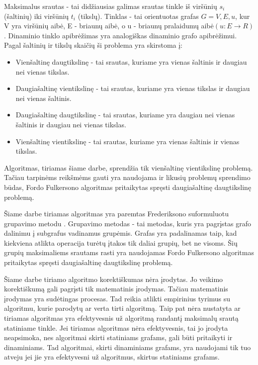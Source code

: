 Maksimalus srautas - tai didžiausias galimas srautas tinkle iš viršūnių $s_i$ (šaltinių) iki viršūnių $t_i$ (tikslų). Tinklas - tai orientuotas grafas $G= {V, E, u}$, kur V yra viršūnių aibė, E - briaunų aibė, o u - briaunų pralaidumų aibė$ ( u : E \rightarrow R )$. Dinaminio tinklo apibrėžimas yra analogiškas dinaminio grafo apibrėžimui. Pagal šaltinių ir tikslų skaičių ši problema yra skirstoma į:
\begin{itemize}
	\item Vienšaltinę daugtikslinę - tai srautas, kuriame yra vienas šaltinis ir daugiau nei vienas tikslas.
	\item Daugiašaltinę vientikslinę - tai srautas, kuriame yra vienas tikslas ir daugiau nei vienas šaltinis.
	\item Daugiašaltinę daugtikslinę - tai srautas, kuriame yra daugiau nei vienas šaltinis ir daugiau nei vienas tikslas.
	\item Vienšaltinę vientikslinę - tai srautas, kuriame yra vienas šaltinis ir vienas tikslas.
\end{itemize}
Algoritmas, tiriamas šiame darbe, sprendžia tik vienšaltinę vientikslinę problemą. Tačiau tarpinėms reikšmėms gauti yra naudojama ir likusių problemų sprendimo būdas, Fordo Fulkersono algoritmas pritaikytas spręsti daugiašaltinę daugtikslinę problemą.

Šiame darbe tiriamas algoritmas yra paremtas Frederiksono suformuluotu grupavimo metodu \cite{DSfUoMST}. Grupavimo metodas - tai metodas, kuris yra pagrįstas grafo dalinimu į subgrafus vadinamus grupėmis. Grafas yra padalinamas taip, kad kiekviena atlikta operacija turėtų įtakos tik daliai grupių, bet ne visoms. Šių grupių maksimaliems srautams rasti yra naudojamas Fordo Fulkersono algoritmas pritaikytas spręsti daugiašaltinę daugtikslinę problemą.

Šiame darbe tiriamo algoritmo korektiškumas nėra įrodytas. Jo veikimo korektiškumą gali pagrįsti tik matematinis įrodymas. Tačiau matematinis įrodymas yra sudėtingas procesas. Tad reikia atlikti empirinius tyrimus su algoritmu, kurie parodytų ar verta tirti algoritmą. Taip pat nėra nustatyta ar tiriamas algoritmas yra efektyvesnis už algoritmą randantį maksimalų srautą statiniame tinkle. Jei tiriamas algoritmas nėra efektyvesnis, tai jo įrodyta neapsimoka, nes algoritmai skirti statiniams grafams, gali būti pritaikyti ir dinaminiams. Tad algoritmai, skirti dinaminiams grafams, yra naudojami tik tuo atveju jei jie yra efektyvesni už algoritmus, skirtus statiniams grafams.

